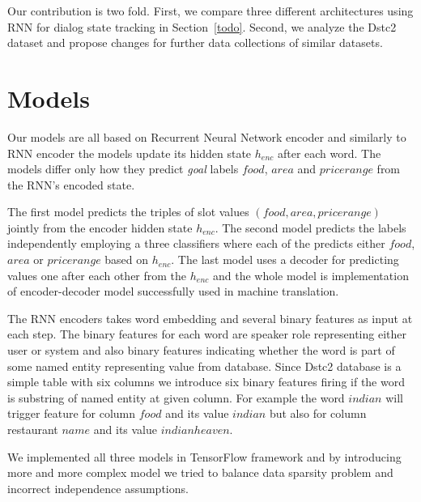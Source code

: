 \documentclass{itatnew}
\begin{document}
Our contribution is two fold. 
First, we compare three different architectures using RNN for dialog state tracking in Section~\ref{todo}.
Second, we analyze the Dstc2 dataset and propose changes for further data collections of similar datasets.


\section{Models}

Our models are all based on Recurrent Neural Network encoder\cite{todo} and similarly to RNN encoder\cite{Lukas} the models update its hidden state $h_{enc}$ after each word.
The models differ only how they predict {\it goal} labels $food$, $area$ and $price range$ from the RNN's encoded state.

The first model predicts the triples of slot values $(food, area, price range)$ jointly from the encoder hidden state $h_{enc}$.
The second model predicts the labels independently employing a three classifiers where each of the predicts either $food$, $area$ or $price range$ based on $h_{enc}$. 
The last model uses a decoder for predicting values one after each other from the $h_{enc}$ and the whole model is implementation of encoder-decoder model successfully used in machine translation\cite{bahdanou}.

The RNN encoders takes word embedding and several binary features as input at each step.
The binary features for each word are speaker role representing either user or system and also binary features indicating whether the word is part of some named entity representing value from database.
Since Dstc2 database is a simple table with six columns we introduce six binary features firing if the word is substring of named entity at given column.
For example the word $indian$ will trigger feature for column $food$ and its value $indian$ but also for column restaurant $name$ and its value $indian heaven$.

We implemented all three models in TensorFlow\cite{tensorflow} framework and by introducing more and more complex model we tried to balance data sparsity problem and incorrect independence assumptions.
\end{document}

